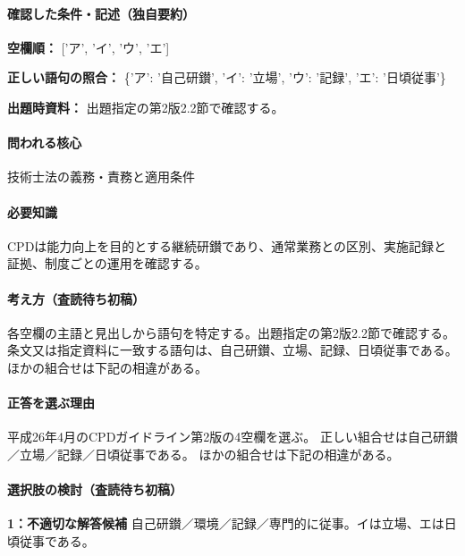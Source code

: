 \paragraph{確認した条件・記述（独自要約）}\mbox{}\par

\noindent\textbf{空欄順：} ['ア', 'イ', 'ウ', 'エ']\par

\noindent\textbf{正しい語句の照合：} \{'ア': '自己研鑚', 'イ': '立場', 'ウ': '記録', 'エ': '日頃従事'\}\par

\noindent\textbf{出題時資料：} 出題指定の第2版2.2節で確認する。\par

\paragraph{問われる核心} 技術士法の義務・責務と適用条件

\paragraph{必要知識} CPDは能力向上を目的とする継続研鑚であり、通常業務との区別、実施記録と証拠、制度ごとの運用を確認する。

\paragraph{考え方（査読待ち初稿）} 各空欄の主語と見出しから語句を特定する。出題指定の第2版2.2節で確認する。 条文又は指定資料に一致する語句は、自己研鑚、立場、記録、日頃従事である。ほかの組合せは下記の相違がある。

\paragraph{正答を選ぶ理由} 平成26年4月のCPDガイドライン第2版の4空欄を選ぶ。 正しい組合せは自己研鑚／立場／記録／日頃従事である。 ほかの組合せは下記の相違がある。

\paragraph{選択肢の検討（査読待ち初稿）}\mbox{}\par

\noindent\textbf{1：不適切な解答候補} 自己研鑚／環境／記録／専門的に従事。イは立場、エは日頃従事である。\par

